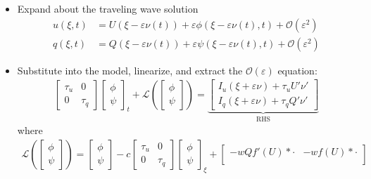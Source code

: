 \documentclass[landscape,final]{baposter}
\newcommand{\LL}{\mathcal{L}}
\newcommand{\OO}{\mathcal{O}}
\begin{document}
\begin{poster}
{
	\begin{itemize}
		\item Expand about the traveling wave solution
		\begin{align*}
			u(\xi, t) &= U(\xi - \varepsilon \nu(t)) + \varepsilon \phi(\xi-\varepsilon \nu(t), t) + \OO(\varepsilon^2) \\
			q(\xi, t) &= Q(\xi - \varepsilon \nu(t)) + \varepsilon \psi(\xi -\varepsilon \nu(t), t) + \OO(\varepsilon^2)
		\end{align*}
		\item Substitute into the model, linearize, and extract the $\OO(\varepsilon)$ equation:
		\begin{align*}
   		\begin{bmatrix}\tau_u & 0 \\ 0 & \tau_q\end{bmatrix} \begin{bmatrix}\phi \\ \psi \end{bmatrix}_t + \LL \left(\begin{bmatrix} \phi \\ \psi \end{bmatrix} \right)
       = 
       \underbrace{\begin{bmatrix} I_u(\xi + \varepsilon \nu) + \tau_u U' \nu' \\ I_q(\xi + \varepsilon \nu) + \tau_q Q' \nu ' \end{bmatrix}}_{\text{RHS}}
		\end{align*}
		where
		\begin{align*}
		\LL \left(\begin{bmatrix} \phi \\ \psi \end{bmatrix} \right) = \begin{bmatrix}\phi \\ \psi \end{bmatrix} - c\begin{bmatrix}\tau_u & 0 \\ 0 & \tau_q\end{bmatrix} \begin{bmatrix}\phi \\ \psi \end{bmatrix}_\xi +
		\begin{bmatrix}
  -w Q f'(U) * \cdot  & -w f(U) * \cdot \\

\end{bmatrix}
\end{align*}
\end{itemize}}
\end{poster}
\end{document}
